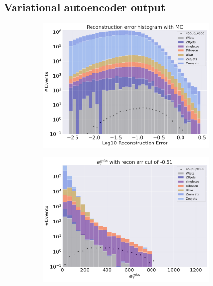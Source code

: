 \subsection*{Variational autoencoder output}












\begin{figure}[H]
    \centering
    \begin{subfigure}{.40\textwidth}
        \includegraphics[width=\textwidth]{Figures/VAE_testing/small/2lep/b_data_recon_big_rm3_feats_sig_450p0p0300_.pdf}
        \caption{ }
        \label{fig:VAE_2lep_big_450_2}
    \end{subfigure}
    \hfill
    \begin{subfigure}{.40\textwidth}
        \includegraphics[width=\textwidth]{Figures/VAE_testing/big/2lep/b_data_recon_big_rm3_feats_sig_450p0p0300_recon_errcut_-0.61.pdf}

\end{subfigure}
\end{figure}
